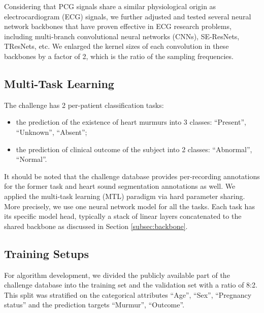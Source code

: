 
Considering that PCG signals share a similar physiological origin as electrocardiogram (ECG) signals, we further adjusted and tested several neural network backbones \cite{Kang_2022_cinc2021_iop} that have proven effective in ECG research problems, including multi-branch convolutional neural networks (CNNs), SE-ResNets, TResNets, etc. We enlarged the kernel sizes of each convolution in these backbones by a factor of 2, which is the ratio of the sampling frequencies.

\subsection{Multi-Task Learning}
\label{subsec:mtl}

The challenge \cite{cinc2022} has 2 per-patient classification tasks:
\begin{itemize}
    \item the prediction of the existence of heart murmurs into 3 classes: ``Present'', ``Unknown'', ``Absent'';
    \item the prediction of clinical outcome of the subject into 2 classes: ``Abnormal'', ``Normal''.
\end{itemize}

It should be noted that the challenge database \cite{Oliveira_2021_CirCor} provides per-recording annotations for the former task and heart sound segmentation annotations as well. We applied the multi-task learning (MTL) paradigm \cite{Caruana_1997_mtl} via hard parameter sharing. More precisely, we use one neural network model for all the tasks. Each task has its specific model head, typically a stack of linear layers concatenated to the shared backbone as discussed in Section \ref{subsec:backbone}.

\subsection{Training Setups}
\label{subsec:training}

For algorithm development, we divided the publicly available part of the challenge database into the training set and the validation set with a ratio of 8:2. This split was stratified on the categorical attributes ``Age'', ``Sex'', ``Pregnancy status'' and the prediction targets ``Murmur'', ``Outcome''.


